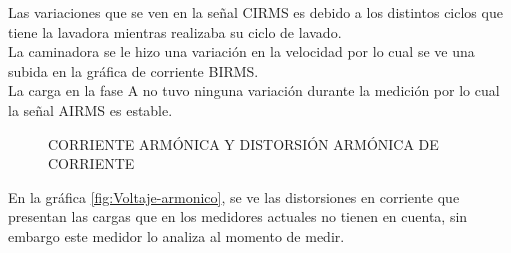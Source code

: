      Las variaciones que se ven en la señal CIRMS es debido a los distintos ciclos que tiene la lavadora mientras realizaba su ciclo de lavado. \\
      La caminadora se le hizo una variación en la velocidad por lo cual se ve una subida en la gráfica de corriente BIRMS.\\
      La carga en la fase A no tuvo ninguna variación durante la medición por lo cual la señal AIRMS es estable.\\
    \begin{figure}[H]
      \hfill
      \hfill
      \hfill
      \caption{CORRIENTE ARMÓNICA Y DISTORSIÓN ARMÓNICA DE CORRIENTE}
      \label{fig:corriente-armonica}
      \end{figure}
      En la gráfica \ref{fig:Voltaje-armonico}, se ve las distorsiones en corriente que presentan las cargas que en los medidores actuales no tienen en cuenta, sin embargo este medidor lo analiza al momento de medir.
